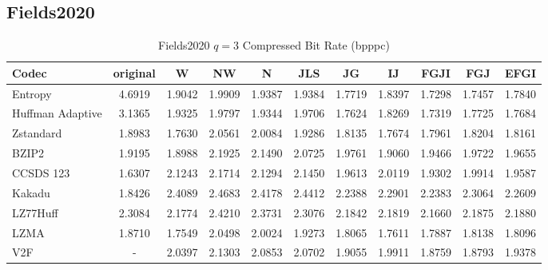 \documentclass{article}
\begin{document}
\subsection{Fields2020}
\begin{table}[h!]
\centering
\caption{Fields2020 $q=3$ Compressed Bit Rate (bpppc)}
\begin{tabular}{|l|cccccccccc|}
\hline
Codec &  original &      W &     NW &      N &    JLS &     JG &     IJ &   FGJI &    FGJ &   EFGI \\
\hline
Entropy & 4.6919 & 1.9042 & 1.9909 & 1.9387 & 1.9384 & 1.7719 & 1.8397 & 1.7298 & 1.7457 & 1.7840 \\
\hline
Huffman Adaptive &    3.1365 & 1.9325 & 1.9797 & 1.9344 & 1.9706 & 1.7624 & 1.8269 & 1.7319 & 1.7725 & 1.7684 \\
Zstandard        &    1.8983 & 1.7630 & 2.0561 & 2.0084 & 1.9286 & 1.8135 & 1.7674 & 1.7961 & 1.8204 & 1.8161 \\
BZIP2            &    1.9195 & 1.8988 & 2.1925 & 2.1490 & 2.0725 & 1.9761 & 1.9060 & 1.9466 & 1.9722 & 1.9655 \\
CCSDS 123        &    1.6307 & 2.1243 & 2.1714 & 2.1294 & 2.1450 & 1.9613 & 2.0119 & 1.9302 & 1.9914 & 1.9587 \\
Kakadu           &    1.8426 & 2.4089 & 2.4683 & 2.4178 & 2.4412 & 2.2388 & 2.2901 & 2.2383 & 2.3064 & 2.2609 \\
LZ77Huff         &    2.3084 & 2.1774 & 2.4210 & 2.3731 & 2.3076 & 2.1842 & 2.1819 & 2.1660 & 2.1875 & 2.1880 \\
LZMA             &    1.8710 & 1.7549 & 2.0498 & 2.0024 & 1.9273 & 1.8065 & 1.7611 & 1.7887 & 1.8138 & 1.8096 \\
V2F              &   - & 2.0397 & 2.1303 & 2.0853 & 2.0702 & 1.9055 & 1.9911 & 1.8759 & 1.8793 & 1.9378 \\
\hline
\end{tabular}
\end{table}
\end{document}
